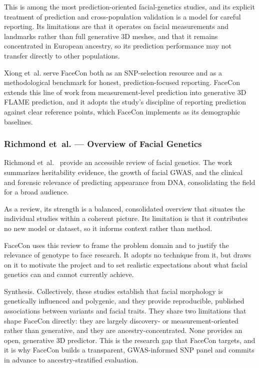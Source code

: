 This is among the most prediction-oriented facial-genetics studies, and its explicit treatment of prediction and cross-population validation is a model for careful reporting. Its limitations are that it operates on facial measurements and landmarks rather than full generative 3D meshes, and that it remains concentrated in European ancestry, so its prediction performance may not transfer directly to other populations.

Xiong et~al. serve FaceCon both as an SNP-selection resource and as a methodological benchmark for honest, prediction-focused reporting. FaceCon extends this line of work from measurement-level prediction into generative 3D FLAME prediction, and it adopts the study's discipline of reporting prediction against clear reference points, which FaceCon implements as its demographic baselines.

\subsubsection{Richmond et~al. --- Overview of Facial Genetics}
Richmond et~al.~\cite{ref:richmond} provide an accessible review of facial genetics. The work summarizes heritability evidence, the growth of facial GWAS, and the clinical and forensic relevance of predicting appearance from DNA, consolidating the field for a broad audience.

As a review, its strength is a balanced, consolidated overview that situates the individual studies within a coherent picture. Its limitation is that it contributes no new model or dataset, so it informs context rather than method.

FaceCon uses this review to frame the problem domain and to justify the relevance of genotype to face research. It adopts no technique from it, but draws on it to motivate the project and to set realistic expectations about what facial genetics can and cannot currently achieve.

Synthesis. Collectively, these studies establish that facial morphology is genetically influenced and polygenic, and they provide reproducible, published associations between variants and facial traits. They share two limitations that shape FaceCon directly: they are largely discovery- or measurement-oriented rather than generative, and they are ancestry-concentrated. None provides an open, generative 3D predictor. This is the research gap that FaceCon targets, and it is why FaceCon builds a transparent, GWAS-informed SNP panel and commits in advance to ancestry-stratified evaluation.

